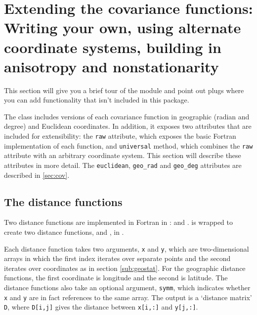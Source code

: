 \documentclass{manual}
\begin{document}
% 

\section{Extending the covariance functions: Writing your own, using alternate coordinate systems, building in anisotropy and nonstationarity}\label{sec:usercov} 
This section will give you a brief tour of the  module and point out plugs where you can add functionality that isn't included in this package.

The  class includes versions of each covariance function in geographic (radian and degree) and Euclidean coordinates. In addition, it exposes two attributes that are included for extensibility: the \texttt{raw} attribute, which exposes the basic Fortran implementation of each function, and \texttt{universal} method, which combines the \texttt{raw} attribute with an arbitrary coordinate system. This section will describe these attributes in more detail. The \texttt{euclidean}, \texttt{geo_rad} and \texttt{geo_deg} attributes are described in \ref{sec:cov}. 

\subsection{The distance functions}\label{sub:distances}
Two distance functions are implemented in Fortran in :  and .  is wrapped to create two distance functions,  and , in .

Each distance function takes two arguments, \texttt{x} and \texttt{y}, which are two-dimensional arrays in which the first index iterates over separate points and the second iterates over coordinates as in section \ref{sub:geostat}. For the geographic distance functions, the first coordinate is longitude and the second is latitude. The distance functions also take an optional argument, \texttt{symm}, which indicates whether \texttt{x} and \texttt{y} are in fact references to the same array. The output is a `distance matrix' \texttt{D}, where \texttt{D[i,j]} gives the distance between \texttt{x[i,:]} and \texttt{y[j,:]}.
\end{document}
